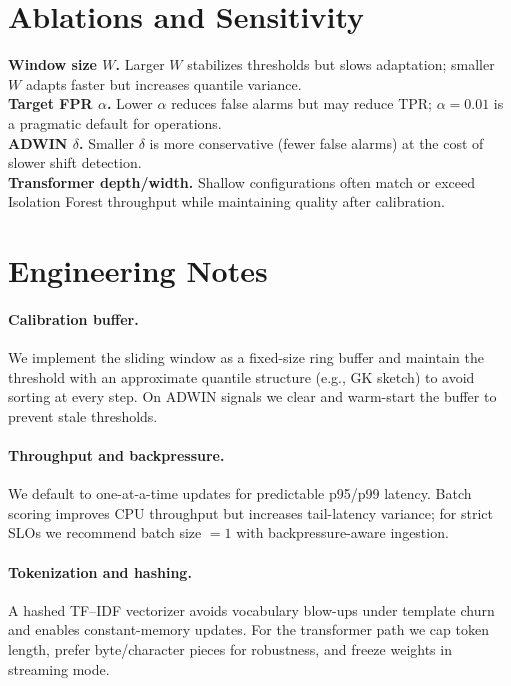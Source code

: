 \documentclass[10pt,twocolumn]{article}
\begin{document}
\section{Ablations and Sensitivity}



\textbf{Window size $W$.} Larger $W$ stabilizes thresholds but slows adaptation; smaller $W$ adapts faster but increases quantile variance. \\
\textbf{Target FPR $\alpha$.} Lower $\alpha$ reduces false alarms but may reduce TPR; $\alpha{=}0.01$ is a pragmatic default for operations. \\
\textbf{ADWIN $\delta$.} Smaller $\delta$ is more conservative (fewer false alarms) at the cost of slower shift detection. \\
\textbf{Transformer depth/width.} Shallow configurations often match or exceed Isolation Forest throughput while maintaining quality after calibration.

\section{Engineering Notes}

\paragraph{Calibration buffer.} We implement the sliding window as a fixed-size ring buffer and maintain the threshold with an approximate quantile structure (e.g., GK sketch) to avoid sorting at every step. On ADWIN signals we clear and warm-start the buffer to prevent stale thresholds.

\paragraph{Throughput and backpressure.} We default to one-at-a-time updates for predictable p95/p99 latency. Batch scoring improves CPU throughput but increases tail-latency variance; for strict SLOs we recommend batch size $=1$ with backpressure-aware ingestion.

\paragraph{Tokenization and hashing.} A hashed TF--IDF vectorizer avoids vocabulary blow-ups under template churn and enables constant-memory updates. For the transformer path we cap token length, prefer byte/character pieces for robustness, and freeze weights in streaming mode.
\end{document}
